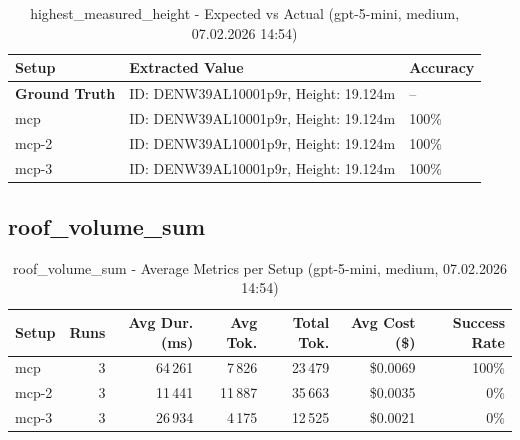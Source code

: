 \documentclass[a4paper,11pt]{article}
\begin{document}
\begin{table}[H]
\centering
\scriptsize
\caption{highest\_measured\_height - Expected vs Actual (gpt-5-mini, medium, 07.02.2026 14:54)}
\begin{tabular}{l l l}
\toprule
Setup & Extracted Value & Accuracy \\
\midrule
\textbf{Ground Truth} & ID: DENW39AL10001p9r, Height: 19.124m & -- \\
\midrule
mcp & ID: DENW39AL10001p9r, Height: 19.124m & 100\% \\
mcp-2 & ID: DENW39AL10001p9r, Height: 19.124m & 100\% \\
mcp-3 & ID: DENW39AL10001p9r, Height: 19.124m & 100\% \\
\bottomrule
\end{tabular}
\end{table}

\clearpage

\subsection{roof\_volume\_sum}

\begin{table}[H]
\centering
\scriptsize
\caption{roof\_volume\_sum - Average Metrics per Setup (gpt-5-mini, medium, 07.02.2026 14:54)}
\label{tab:combined\_roof\_volume\_sum\_metrics\_20260207}
\begin{tabular}{l r r r r r r}
\toprule
Setup & Runs & Avg Dur. (ms) & Avg Tok. & Total Tok. & Avg Cost (\$) & Success Rate \\
\midrule
mcp & 3 & 64\,261 & 7\,826 & 23\,479 & \$0.0069 & 100\% \\
mcp-2 & 3 & 11\,441 & 11\,887 & 35\,663 & \$0.0035 & 0\% \\
mcp-3 & 3 & 26\,934 & 4\,175 & 12\,525 & \$0.0021 & 0\% \\
\bottomrule
\end{tabular}
\end{table}
\end{document}
